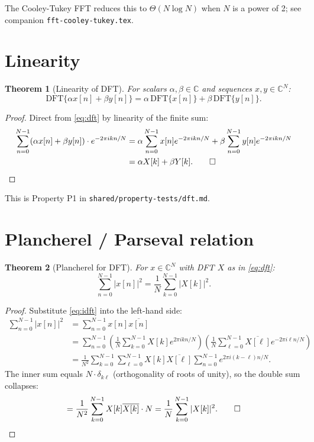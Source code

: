 \documentclass[11pt,a4paper]{article}
\theoremstyle{definition}
\theoremstyle{plain}
\newtheorem{theorem}{Theorem}
\begin{document}
The Cooley-Tukey FFT \cite{Cooley1965} reduces this to $\Theta(N \log N)$ when $N$
is a power of 2; see companion \texttt{fft-cooley-tukey.tex}.

\section{Linearity}

\begin{theorem}[Linearity of DFT]
\label{thm:linearity}
For scalars $\alpha, \beta \in \mathbb{C}$ and sequences $x, y \in \mathbb{C}^N$:
\begin{equation}
\mathrm{DFT}\{\alpha x[n] + \beta y[n]\} = \alpha\, \mathrm{DFT}\{x[n]\} + \beta\, \mathrm{DFT}\{y[n]\}.
\end{equation}
\end{theorem}

\begin{proof}
Direct from \eqref{eq:dft} by linearity of the finite sum:
\begin{align*}
\sum_{n=0}^{N-1} (\alpha x[n] + \beta y[n]) \cdot e^{-2\pi i k n / N}
&= \alpha \sum_{n=0}^{N-1} x[n] e^{-2\pi i k n / N} + \beta \sum_{n=0}^{N-1} y[n] e^{-2\pi i k n / N} \\
&= \alpha X[k] + \beta Y[k]. \qed
\end{align*}
\end{proof}

This is Property P1 in \texttt{shared/property-tests/dft.md}.

\section{Plancherel / Parseval relation}

\begin{theorem}[Plancherel for DFT]
\label{thm:plancherel}
For $x \in \mathbb{C}^N$ with DFT $X$ as in \eqref{eq:dft}:
\begin{equation}
\label{eq:plancherel}
\sum_{n=0}^{N-1} |x[n]|^2 = \frac{1}{N} \sum_{k=0}^{N-1} |X[k]|^2.
\end{equation}
\end{theorem}

\begin{proof}
Substitute \eqref{eq:idft} into the left-hand side:
\begin{align*}
\sum_{n=0}^{N-1} |x[n]|^2 &= \sum_{n=0}^{N-1} x[n] \overline{x[n]} \\
&= \sum_{n=0}^{N-1} \left( \frac{1}{N} \sum_{k=0}^{N-1} X[k] e^{2\pi i k n/N} \right)
\left( \frac{1}{N} \sum_{\ell=0}^{N-1} \overline{X[\ell]} e^{-2\pi i \ell n/N} \right) \\
&= \frac{1}{N^2} \sum_{k=0}^{N-1} \sum_{\ell=0}^{N-1} X[k] \overline{X[\ell]}
\sum_{n=0}^{N-1} e^{2\pi i (k-\ell) n / N}.
\end{align*}
The inner sum equals $N \cdot \delta_{k\ell}$ (orthogonality of roots of unity),
so the double sum collapses:
\[
= \frac{1}{N^2} \sum_{k=0}^{N-1} X[k] \overline{X[k]} \cdot N
= \frac{1}{N} \sum_{k=0}^{N-1} |X[k]|^2. \qed
\]
\end{proof}
\end{document}

